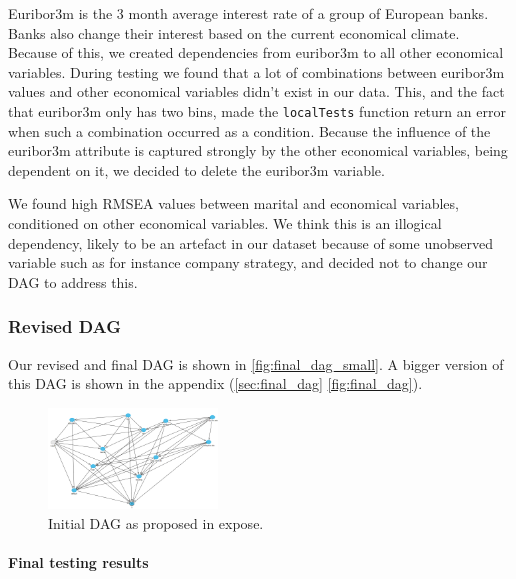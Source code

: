 \documentclass[11pt,]{article}
\let\oldparagraph\paragraph
\renewcommand{\paragraph}[1]{\oldparagraph{#1}\mbox{}}
\begin{document}
\begin{multicols}{2}
\bigskip

Euribor3m is the 3 month average interest rate of a group of European
banks. Banks also change their interest based on the current economical
climate. Because of this, we created dependencies from euribor3m to all
other economical variables. During testing we found that a lot of
combinations between euribor3m values and other economical variables
didn't exist in our data. This, and the fact that euribor3m only has two
bins, made the \texttt{localTests} function return an error when such a
combination occurred as a condition. Because the influence of the
euribor3m attribute is captured strongly by the other economical
variables, being dependent on it, we decided to delete the euribor3m
variable.

We found high RMSEA values between marital and economical variables,
conditioned on other economical variables. We think this is an illogical
dependency, likely to be an artefact in our dataset because of some
unobserved variable such as for instance company strategy, and decided
not to change our DAG to address this.

\hypertarget{revised-dag}{%
\subsubsection{Revised DAG}\label{revised-dag}}

Our revised and final DAG is shown in \autoref{fig:final_dag_small}. A
bigger version of this DAG is shown in the appendix
(\autoref{sec:final_dag} \autoref{fig:final_dag}).

\begin{figure}[H]
    \centering
    \includegraphics[width=0.4\textwidth]{images/final_dag}
    \caption{Initial DAG as proposed in expose.}
    \label{fig:final_dag_small}
\end{figure}

\hypertarget{final-testing-results}{%
\paragraph{Final testing results}\label{final-testing-results}}


\end{multicols}
\end{document}
